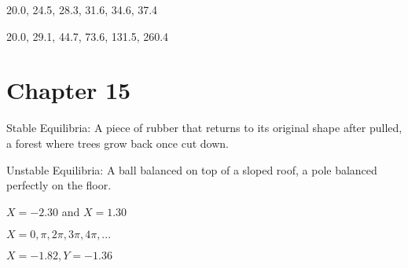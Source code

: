 \documentclass[]{memoir}
\begin{document}
20.0, 24.5, 28.3, 31.6, 34.6, 37.4


20.0, 29.1, 44.7, 73.6, 131.5, 260.4

\section{Chapter 15}


Stable Equilibria: A piece of rubber that returns to its original shape
after pulled, a forest where trees grow back once cut down.

Unstable Equilibria: A ball balanced on top of a sloped roof, a pole
balanced perfectly on the floor.


$X=-2.30$ and $X=1.30$


$X=0,\pi,2\pi,3\pi,4\pi,...$


$X=-1.82, Y=-1.36$

\end{document}
